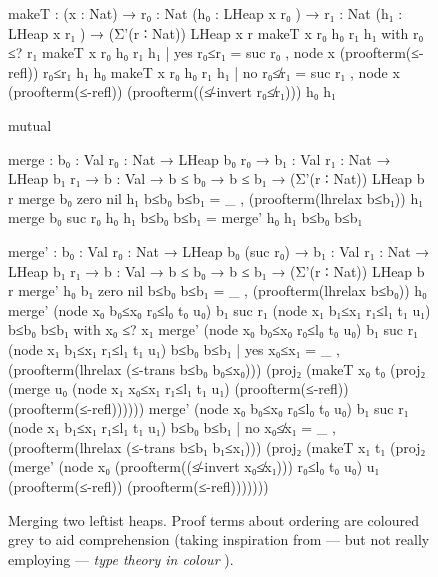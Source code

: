 \begin{figure}
\setlength{\mathindent}{0em}
\begin{code}
makeT : (x : Nat) →  {r₀  : Nat} (h₀  : LHeap x r₀  ) →
                     {r₁  : Nat} (h₁  : LHeap x r₁  ) → (Σ'(r ∶ Nat)) LHeap x r
makeT x {r₀} h₀ {r₁} h₁ with r₀ ≤? r₁
makeT x {r₀} h₀ {r₁} h₁ | yes  r₀≤r₁ =  suc r₀  ,
                                        node x (proofterm(≤-refl))  r₀≤r₁                          h₁  h₀
makeT x {r₀} h₀ {r₁} h₁ | no   r₀≰r₁ =  suc r₁  ,
                                        node x (proofterm(≤-refl))  (proofterm((≰-invert r₀≰r₁)))  h₀  h₁

mutual

  merge :  {b₀  : Val} {r₀  : Nat} → LHeap b₀  r₀  →
           {b₁  : Val} {r₁  : Nat} → LHeap b₁  r₁  →
           {b   : Val} → b ≤ b₀ → b ≤ b₁ → (Σ'(r ∶ Nat)) LHeap b r
  merge {b₀} {zero    } nil  h₁ b≤b₀ b≤b₁ = _ , (proofterm(lhrelax b≤b₁)) h₁
  merge {b₀} {suc r₀  } h₀   h₁ b≤b₀ b≤b₁ = merge' h₀ h₁ b≤b₀ b≤b₁

  merge' :  {b₀  : Val} {r₀   : Nat} → LHeap b₀  (suc r₀)  →
            {b₁  : Val} {r₁   : Nat} → LHeap b₁  r₁        →
            {b   : Val} → b ≤ b₀ → b ≤ b₁ → (Σ'(r ∶ Nat)) LHeap b r
  merge'  h₀                           {b₁} {zero     } nil
          b≤b₀ b≤b₁ = _ , (proofterm(lhrelax b≤b₀)) h₀
  merge'  (node x₀ b₀≤x₀ r₀≤l₀ t₀ u₀)  {b₁} {suc r₁   } (node x₁ b₁≤x₁ r₁≤l₁ t₁ u₁)
          b≤b₀ b≤b₁ with x₀ ≤? x₁
  merge'  (node x₀ b₀≤x₀ r₀≤l₀ t₀ u₀)  {b₁} {suc r₁   } (node x₁ b₁≤x₁ r₁≤l₁ t₁ u₁)
          b≤b₀ b≤b₁ | yes  x₀≤x₁ =
            _ ,                 (proofterm(lhrelax (≤-trans b≤b₀ b₀≤x₀)))
                                  (proj₂   (makeT x₀ t₀
                                             (proj₂ (merge   u₀ (node x₁ x₀≤x₁ r₁≤l₁ t₁ u₁)
                                                             (proofterm(≤-refl)) (proofterm(≤-refl))))))
  merge'  (node x₀ b₀≤x₀ r₀≤l₀ t₀ u₀)  {b₁} {suc r₁   } (node x₁ b₁≤x₁ r₁≤l₁ t₁ u₁)
          b≤b₀ b≤b₁ | no   x₀≰x₁ =
            _ ,                    (proofterm(lhrelax (≤-trans b≤b₁ b₁≤x₁)))
                                     (proj₂   (makeT x₁ t₁
                                                  (proj₂ (merge'   (node x₀ (proofterm((≰-invert x₀≰x₁))) r₀≤l₀ t₀ u₀) u₁
                                                                   (proofterm(≤-refl)) (proofterm(≤-refl)))))))
\end{code}
\caption{Merging two leftist heaps. Proof terms about ordering are coloured grey to aid comprehension (taking inspiration from --- but not really employing --- \emph{type theory in colour} \citep{Bernardy-color}).}
\label{fig:merge}
\end{figure}

